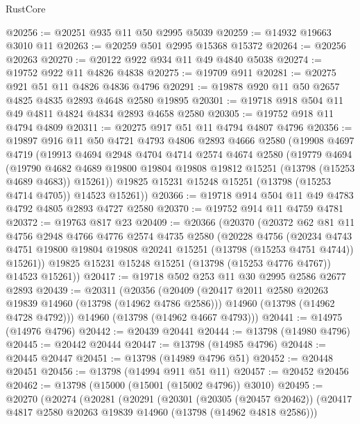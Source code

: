 \begin{lexlean}{RustCore}
\begin{coremodule}
@20256 := @20251 @935 @11 @50 @2995 @5039
@20259 := @14932 @19663 @3010 @11
@20263 := @20259 @501 @2995 @15368 @15372
@20264 := @20256 @20263
@20270 := @20122 @922 @934 @11 @49 @4840 @5038
@20274 := @19752 @922 @11 @4826 @4838
@20275 := @19709 @911
@20281 := @20275 @921 @51 @11 @4826 @4836 @4796
@20291 := @19878 @920 @11 @50 @2657 @4825 @4835 @2893 @4648 @2580 @19895
@20301 := @19718 @918 @504 @11 @49 @4811 @4824 @4834 @2893 @4658 @2580
@20305 := @19752 @918 @11 @4794 @4809
@20311 := @20275 @917 @51 @11 @4794 @4807 @4796
@20356 := @19897
    @916
    @11
    @50
    @4721
    @4793
    @4806
    @2893
    @4666
    @2580
    (@19908
      @4697
      @4719
      (@19913
        @4694
        @2948
        @4704
        @4714
        @2574
        @4674
        @2580
        (@19779
          @4694
          (@19790
            @4682
            @4689
            @19800
            @19804
            @19808
            @19812
            @15251
            (@13798 (@15253 @4689 @4683))
            @15261))
        @19825
        @15231
        @15248
        @15251
        (@13798 (@15253 @4714 @4705))
        @14523
        @15261))
@20366 := @19718 @914 @504 @11 @49 @4783 @4792 @4805 @2893 @4727 @2580
@20370 := @19752 @914 @11 @4759 @4781
@20372 := @19763 @817 @23
@20409 := @20366
    (@20370
      (@20372
        @62
        @81
        @11
        @4756
        @2948
        @4766
        @4776
        @2574
        @4735
        @2580
        (@20228
          @4756
          (@20234
            @4743
            @4751
            @19800
            @19804
            @19808
            @20241
            @15251
            (@13798 (@15253 @4751 @4744))
            @15261))
        @19825
        @15231
        @15248
        @15251
        (@13798 (@15253 @4776 @4767))
        @14523
        @15261))
@20417 := @19718 @502 @253 @11 @30 @2995 @2586 @2677 @2893
@20439 := @20311
    (@20356
      (@20409
        (@20417 @2011 @2580 @20263 @19839 @14960 (@13798 (@14962 @4786 @2586)))
        @14960
        (@13798 (@14962 @4728 @4792)))
      @14960
      (@13798 (@14962 @4667 @4793)))
@20441 := @14975 (@14976 @4796)
@20442 := @20439 @20441
@20444 := @13798 (@14980 @4796)
@20445 := @20442 @20444
@20447 := @13798 (@14985 @4796)
@20448 := @20445 @20447
@20451 := @13798 (@14989 @4796 @51)
@20452 := @20448 @20451
@20456 := @13798 (@14994 @911 @51 @11)
@20457 := @20452 @20456
@20462 := @13798 (@15000 (@15001 (@15002 @4796)) @3010)
@20495 := @20270
    (@20274
      (@20281
        (@20291
          (@20301
            (@20305 (@20457 @20462))
            (@20417 @4817 @2580 @20263 @19839 @14960 (@13798 (@14962 @4818 @2586)))

\end{coremodule}
\end{lexlean}
